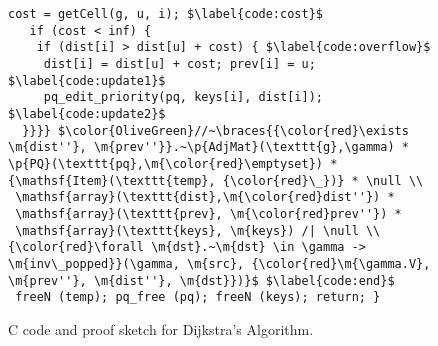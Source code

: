 \begin{figure}[t]
\begin{lstlisting}[mathescape=true,showlines=true]
   cost = getCell(g, u, i); $\label{code:cost}$
   if (cost < inf) {
    if (dist[i] > dist[u] + cost) { $\label{code:overflow}$
     dist[i] = dist[u] + cost; prev[i] = u; $\label{code:update1}$
     pq_edit_priority(pq, keys[i], dist[i]); $\label{code:update2}$
  }}}} $\color{OliveGreen}//~\braces{{\color{red}\exists \m{dist''}, \m{prev''}}.~\p{AdjMat}(\texttt{g},\gamma) * \p{PQ}(\texttt{pq},\m{\color{red}\emptyset}) * {\mathsf{Item}(\texttt{temp}, {\color{red}\_})} * \null \\
 \mathsf{array}(\texttt{dist},\m{\color{red}dist''}) *
 \mathsf{array}(\texttt{prev}, \m{\color{red}prev''}) *
 \mathsf{array}(\texttt{keys}, \m{keys}) /| \null \\
{\color{red}\forall \m{dst}.~\m{dst} \in \gamma -> \m{inv\_popped}}(\gamma, \m{src}, {\color{red}\m{\gamma.V}, \m{prev''}, \m{dist''}, \m{dst}})}$ $\label{code:end}$
 freeN (temp); pq_free (pq); freeN (keys); return; }
\end{lstlisting}
\caption{C code and proof sketch for Dijkstra's Algorithm.}
\label{fig:decorated}
\end{figure}



